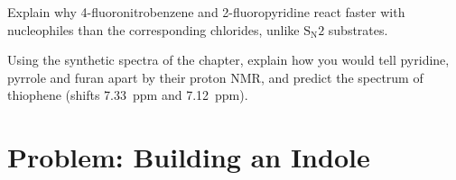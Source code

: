 \begin{exercise}[$\star\star\star$]\label{exo:b3:heterocycles:11}
Explain why 4-fluoronitrobenzene and 2-fluoropyridine react faster with
nucleophiles than the corresponding chlorides, unlike $\mathrm S_\mathrm N2$ substrates.
\end{exercise}

\begin{exercise}[$\star\star\star$]\label{exo:b3:heterocycles:12}
Using the synthetic spectra of the chapter, explain how you would tell pyridine,
pyrrole and furan apart by their proton NMR, and predict the spectrum of
thiophene (shifts \qty{7.33}{ppm} and \qty{7.12}{ppm}).
\end{exercise}

\section{Problem: Building an Indole}

